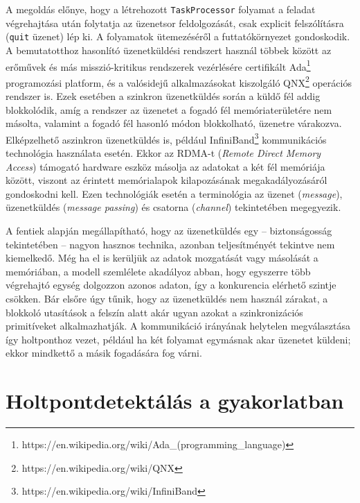     \medskip    
    \lstset{
        basicstyle=\footnotesize\ttfamily
    }    
        
    \medskip
    
    A megoldás előnye, hogy a létrehozott \texttt{TaskProcessor} folyamat a feladat végrehajtása után folytatja az üzenetsor feldolgozását, csak explicit felszólításra (\texttt{quit} üzenet) lép ki. A folyamatok ütemezéséről a futtatókörnyezet gondoskodik. A bemutatotthoz hasonlító üzenetküldési rendszert használ többek között az erőművek és más misszió-kritikus rendszerek vezérlésére certifikált Ada\footnote{https://en.wikipedia.org/wiki/Ada\_(programming\_language)} programozási platform, és a valósidejű alkalmazásokat kiszolgáló QNX\footnote{https://en.wikipedia.org/wiki/QNX} operációs rendszer is. Ezek esetében a szinkron üzenetküldés során a küldő fél addig blokkolódik, amíg a rendszer az üzenetet a fogadó fél memóriaterületére nem másolta, valamint a fogadó fél hasonló módon blokkolható, üzenetre várakozva. Elképzelhető aszinkron üzenetküldés is, például InfiniBand\footnote{https://en.wikipedia.org/wiki/InfiniBand} kommunikációs technológia használata esetén. Ekkor az RDMA-t (\emph{Remote Direct Memory Access}) támogató hardware eszköz másolja az adatokat a két fél memóriája között, viszont az érintett memórialapok kilapozásának megakadályozásáról gondoskodni kell. Ezen technológiák esetén a terminológia az üzenet (\emph{message}), üzenetküldés (\emph{message passing}) és csatorna (\emph{channel}) tekintetében megegyezik.
    
    A fentiek alapján megállapítható, hogy az üzenetküldés egy -- biztonságosság tekintetében -- nagyon hasznos technika, azonban teljesítményét tekintve nem kiemelkedő. Még ha el is kerüljük az adatok mozgatását vagy másolását a memóriában, a modell szemlélete akadályoz abban, hogy egyszerre több végrehajtó egység dolgozzon azonos adaton, így a konkurencia elérhető szintje csökken. Bár elsőre úgy tűnik, hogy az üzenetküldés nem használ zárakat, a blokkoló utasítások a felszín alatt akár ugyan azokat a szinkronizációs primitíveket alkalmazhatják. A kommunikáció irányának helytelen megválasztása így holtponthoz vezet, például ha két folyamat egymásnak akar üzenetet küldeni; ekkor mindkettő a másik fogadására fog várni.
    
\section{Holtpontdetektálás a gyakorlatban} 
\label{sec:dl-avoiding}


